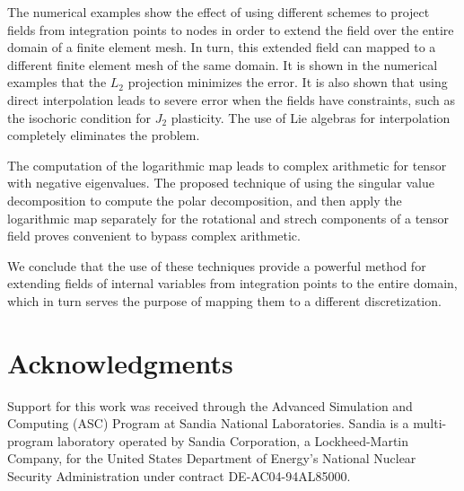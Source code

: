 \documentclass[12pt]{article}
\begin{document}
The numerical examples show the effect of using different schemes to project
fields from integration points to nodes in order to extend the field over the
entire domain of a finite element mesh. In turn, this extended field can mapped
to a different finite element mesh of the same domain. It is shown in the
numerical examples that the $L_2$ projection minimizes the error.
It is also shown that using direct interpolation leads to severe error when the
fields have constraints, such as the isochoric condition for $J_2$ plasticity.
The use of Lie algebras for interpolation completely eliminates the problem.

The computation of the logarithmic map leads to complex arithmetic for tensor
with negative eigenvalues. The proposed technique of using the singular value
decomposition to compute the polar decomposition, and then apply the logarithmic
map separately for the rotational and strech components of a tensor field proves
convenient to bypass complex arithmetic.

We conclude that the use of these techniques provide a powerful method for
extending fields of internal variables from integration points to the entire
domain, which in turn serves the purpose of mapping them to a different
discretization.

\section{Acknowledgments}

Support for this work was received through the Advanced Simulation and Computing
(ASC) Program at Sandia National Laboratories. Sandia is a multi-program
laboratory operated by Sandia Corporation, a Lockheed-Martin Company, for the
United States Department of Energy's National Nuclear Security Administration
under contract DE-AC04-94AL85000.



\end{document}
